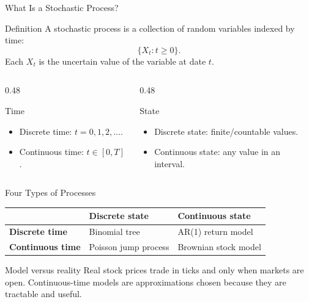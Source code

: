 \documentclass[aspectratio=169,11pt]{beamer}
\begin{document}
\begin{frame}{What Is a Stochastic Process?}
    \begin{block}{Definition}
        A stochastic process is a collection of random variables indexed by time:
        \[
            \{X_t: t\geq 0\}.
        \]
        Each \(X_t\) is the uncertain value of the variable at date \(t\).
    \end{block}

    \begin{columns}[T]
        \begin{column}{0.48\textwidth}
            \begin{block}{Time}
                \begin{itemize}
                    \item Discrete time: \(t=0,1,2,\ldots\).
                    \item Continuous time: \(t\in[0,T]\).
                \end{itemize}
            \end{block}
        \end{column}
        \begin{column}{0.48\textwidth}
            \begin{block}{State}
                \begin{itemize}
                    \item Discrete state: finite/countable values.
                    \item Continuous state: any value in an interval.
                \end{itemize}
            \end{block}
        \end{column}
    \end{columns}
\end{frame}

\begin{frame}{Four Types of Processes}
    \begin{center}
    \begin{tabular}{lll}
        \toprule
        & \textbf{Discrete state} & \textbf{Continuous state} \\
        \midrule
        \textbf{Discrete time}
        & Binomial tree
        & AR(1) return model \\
        \textbf{Continuous time}
        & Poisson jump process
        & Brownian stock model \\
        \bottomrule
    \end{tabular}
    \end{center}

    \vspace{1em}
    \begin{alertblock}{Model versus reality}
        Real stock prices trade in ticks and only when markets are open.
        Continuous-time models are approximations chosen because they are tractable and useful.
    \end{alertblock}
\end{frame}
\end{document}
